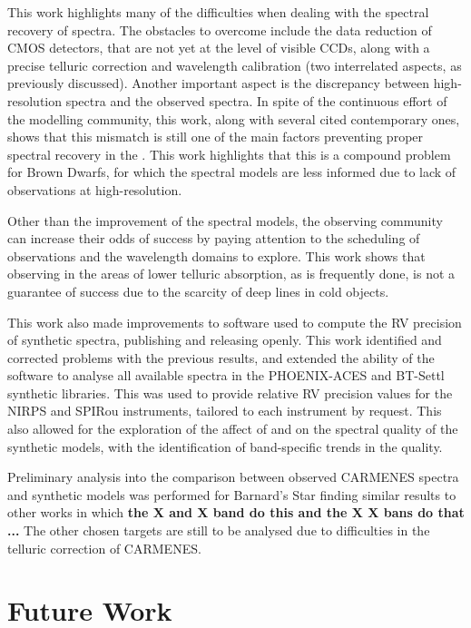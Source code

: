 This work highlights many of the difficulties when dealing with the spectral recovery of \nir{} spectra.
The obstacles to overcome include the data reduction of \nir{} CMOS detectors, that are not yet at the level of visible CCDs, along with a precise telluric correction and wavelength calibration (two interrelated aspects, as previously discussed).
Another important aspect is the discrepancy between \nir{} high-resolution spectra and the observed spectra.
In spite of the continuous effort of the modelling community, this work, along with several cited contemporary ones, shows that this mismatch is still one of the main factors preventing proper spectral recovery in the \nir{}.
This work highlights that this is a compound problem for Brown Dwarfs, for which the spectral models are less informed due to lack of observations at high-resolution.

Other than the improvement of the spectral models, the observing community can increase their odds of success by paying attention to the scheduling of observations and the wavelength domains to explore.
This work shows that observing in the areas of lower telluric absorption, as is frequently done, is not a guarantee of success due to the scarcity of deep lines in cold objects.

This work also made improvements to software used to compute the {RV} precision of synthetic spectra, publishing and releasing \eniric{} openly.
This work identified and corrected problems with the previous results, and extended the ability of the software to analyse all available spectra in the {PHOENIX-ACES} and {BT-Settl} synthetic libraries.
This was used to provide relative {RV} precision values for the {NIRPS} and {SPIRou} instruments, tailored to each instrument by request.
This also allowed for the exploration of the affect of \Logg{} and \feh{} on the spectral quality of the synthetic models, with the identification of band-specific trends in the quality.

Preliminary analysis into the comparison between observed {CARMENES} spectra and synthetic models was performed for Barnard's Star finding similar results to other works in which \textbf{the X and X band do this and the X X bans do that ...}\todo{} The other chosen targets are still to be analysed due to difficulties in the telluric correction of {CARMENES}.


\section{Future Work}
\label{subsec:future}

